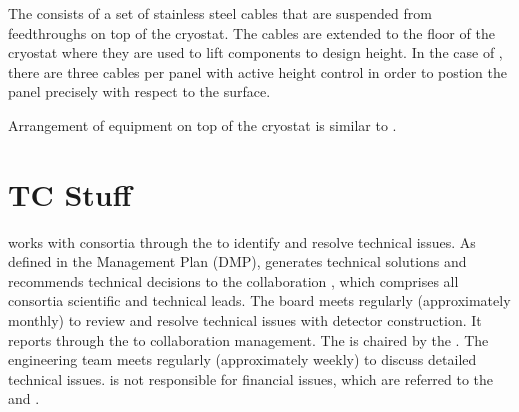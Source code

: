 The   consists of a set of stainless steel
cables that are suspended from feedthroughs on top of the
cryostat. The cables are extended to the floor of the cryostat where
they are used to lift components to design height. In the case of
, there are three cables per panel with active height
control in order to postion the panel precisely with respect to the
 surface.


Arrangement of equipment on top of the cryostat is similar to . 

\section{TC Stuff}

 works with consortia through the  to identify and
resolve technical issues.  As defined in the  Management
Plan (DMP),   generates technical solutions and
recommends technical decisions to the  collaboration
, which comprises all consortia scientific and technical
leads. The board meets regularly (approximately monthly) to review and
resolve technical issues with detector construction. It reports
through the  to collaboration management. The 
 is chaired by the  . The
 engineering team meets regularly (approximately weekly) to
discuss detailed technical issues.   is not responsible for
financial issues, which are referred to the  and
.

